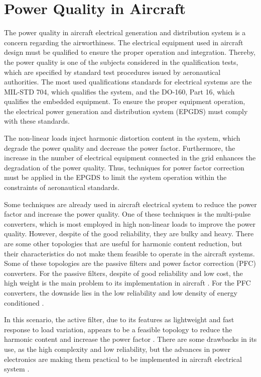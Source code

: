 \section{Power Quality in Aircraft}\label{sec:Power_Quality}

The power quality in aircraft electrical generation and distribution system is a concern regarding the airworthiness. The electrical equipment used in aircraft design must be qualified to ensure the proper operation and integration. Thereby, the power quality is one of the subjects considered in the qualification tests, which are specified by standard test procedures issued by aeronautical authorities. The most used qualifications standards for electrical systems are the MIL-STD 704, which qualifies the system, and the DO-160, Part 16, which qualifies the embedded equipment. To ensure the proper equipment operation, the electrical power generation and distribution system (EPGDS) must comply with these standards.

The non-linear loads inject harmonic distortion content in the system, which degrade the power quality and decrease the power factor. Furthermore, the increase in the number of electrical equipment connected in the grid enhances the degradation of the power quality. Thus, techniques for power factor correction must be applied in the EPGDS to limit the system operation within the constraints of aeronautical standards.

Some techniques are already used in aircraft electrical system to reduce the power factor and increase the power quality. One of these techniques is the multi-pulse converters, which is most employed in high non-linear loads to improve the power quality. However, despite of the good reliability, they are bulky and heavy. There are some other topologies that are useful for harmonic content reduction, but their characteristics do not make them feasible to operate in the aircraft systems. Some of these topologies are the passive filters and power factor correction (PFC) converters. For the passive filters, despite of good reliability and low cost, the high weight is the main problem to its implementation in aircraft \citep{Barruel2004}. For the PFC converters, the downside lies in the low reliability and low density of energy conditioned \citep{Zhu2014,Gong2003,Lobo2005}. 

In this scenario, the active filter, due to its features as lightweight and fast response to load variation, appears to be a feasible topology to reduce the harmonic content and increase the power factor \citep{Zhu2014,Chen2012control,Karatzaferis2013}. There are some drawbacks in its use, as the high complexity and low reliability, but the advances in power electronics are making them practical to be implemented in aircraft electrical system \citep{Abdelhafez2009}.





